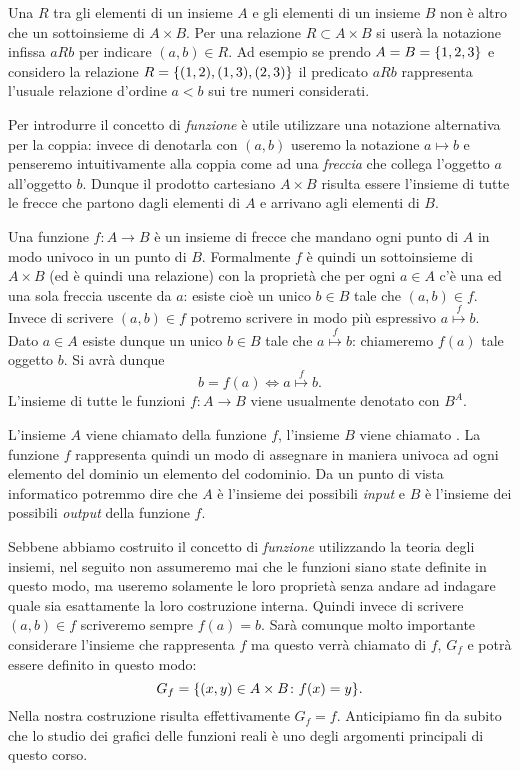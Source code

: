 Una  $R$ tra gli elementi di un insieme $A$ e gli elementi
di un insieme $B$ non è altro che un sottoinsieme di $A\times B$.
Per una relazione $R\subset A\times B$ si userà la notazione infissa
$aRb$ per indicare $(a,b)\in R$.
Ad esempio se prendo $A=B={\left\{ 1,2,3 \right\}}$ e considero la relazione $R={\left\{ (1,2),(1,3),(2,3) \right\}}$
il predicato $aRb$ rappresenta l'usuale relazione d'ordine $a<b$ sui
tre numeri considerati.

Per introdurre il concetto di \emph{funzione} è utile
utilizzare una notazione alternativa per la coppia: invece di denotarla
con $(a,b)$ useremo la notazione $a \mapsto b$ e penseremo intuitivamente
alla coppia come ad una \emph{freccia} che collega l'oggetto $a$
all'oggetto $b$. Dunque il prodotto cartesiano
$A\times B$ risulta essere l'insieme di tutte le frecce che partono dagli
elementi di $A$ e arrivano agli elementi di $B$.

Una funzione $f\colon A \to B$ è un insieme di frecce che mandano
ogni punto di $A$ in modo univoco in un punto di $B$. Formalmente
$f$ è quindi un sottoinsieme di $A\times B$
(ed è quindi una relazione) con la proprietà che
per ogni $a\in A$ c'è una ed una sola freccia uscente da $a$:
esiste cioè un unico $b\in B$ tale che $(a,b)\in f$.
Invece di scrivere $(a,b)\in f$ potremo scrivere in modo più espressivo
$a\stackrel f \mapsto b$.
Dato $a\in A$ esiste dunque un unico $b\in B$ tale che
$a\stackrel f \mapsto b$: chiameremo $f(a)$ tale oggetto $b$.
Si avrà dunque
\[
 b=f(a) \iff a\stackrel f \mapsto b.
\]
L'insieme di tutte le funzioni $f\colon A\to B$ viene usualmente denotato con $B^A$.
%
%
%

L'insieme $A$ viene chiamato  della funzione $f$,
l'insieme $B$ viene chiamato .
La funzione $f$ rappresenta quindi un modo di assegnare in maniera univoca
ad ogni elemento del dominio un elemento del codominio.
Da un punto di vista informatico potremmo dire che $A$ è l'insieme
dei possibili \emph{input} e $B$ è l'insieme dei possibili \emph{output}
della funzione $f$.

Sebbene abbiamo costruito il concetto di \emph{funzione} utilizzando la teoria
degli insiemi, nel seguito non assumeremo mai che le funzioni siano state definite
in questo modo, ma useremo solamente le loro proprietà senza andare ad indagare
quale sia esattamente la loro costruzione interna.
Quindi invece di scrivere $(a,b)\in f$ scriveremo sempre $f(a)=b$.
Sarà comunque molto importante
considerare l'insieme che rappresenta $f$ ma questo verrà chiamato
 di $f$, $G_f$ e potrà essere definito in questo modo:
\[
  G_f = {\left\{ (x,y)\in A \times B\colon f(x)=y \right\}}.
\]
Nella nostra costruzione risulta effettivamente $G_f = f$.
Anticipiamo fin da subito che lo studio dei grafici delle funzioni reali è
uno degli argomenti principali di questo corso.

